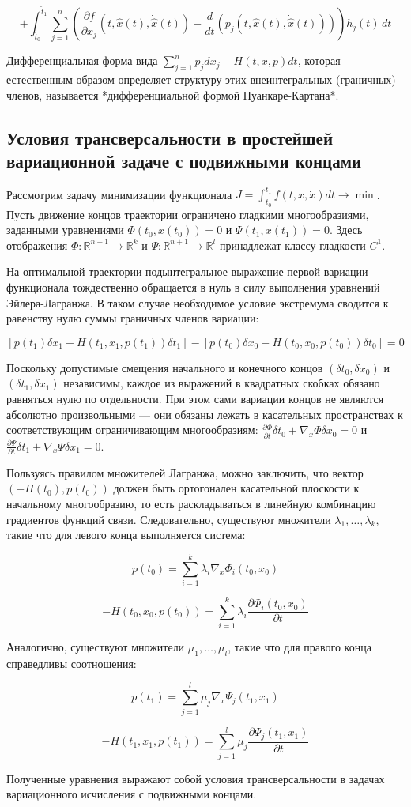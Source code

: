 $$+ \int_{\hat{t}_0}^{\hat{t}_1} \sum_{j=1}^n \left( \frac{\partial f}{\partial x_j}\left(t, \hat{x}(t), \dot{\hat{x}}(t)\right) - \frac{d}{dt} \left( p_j\left(t, \hat{x}(t), \dot{\hat{x}}(t)\right) \right) \right) h_j(t) \, dt$$

Дифференциальная форма вида $\sum_{j=1}^n p_j d x_j - H(t, x, p) dt$, которая естественным образом определяет структуру этих внеинтегральных (граничных) членов, называется *дифференциальной формой Пуанкаре-Картана*.

\subsection{Условия трансверсальности в простейшей вариационной задаче с подвижными концами}

Рассмотрим задачу минимизации функционала $J = \int_{t_0}^{t_1} f(t, x, \dot{x}) dt \to \min$.
Пусть движение концов траектории ограничено гладкими многообразиями, заданными уравнениями $\Phi(t_0, x(t_0)) = 0$ и $\Psi(t_1, x(t_1)) = 0$.
Здесь отображения $\Phi: \mathbb{R}^{n+1} \to \mathbb{R}^k$ и $\Psi: \mathbb{R}^{n+1} \to \mathbb{R}^l$ принадлежат классу гладкости $C^1$.

На оптимальной траектории подынтегральное выражение первой вариации функционала тождественно обращается в нуль в силу выполнения уравнений Эйлера-Лагранжа.
В таком случае необходимое условие экстремума сводится к равенству нулю суммы граничных членов вариации:

$$[p(t_1)\delta x_1 - H(t_1, x_1, p(t_1))\delta t_1] - [p(t_0)\delta x_0 - H(t_0, x_0, p(t_0))\delta t_0] = 0$$

Поскольку допустимые смещения начального и конечного концов $(\delta t_0, \delta x_0)$ и $(\delta t_1, \delta x_1)$ независимы, каждое из выражений в квадратных скобках обязано равняться нулю по отдельности.
При этом сами вариации концов не являются абсолютно произвольными — они обязаны лежать в касательных пространствах к соответствующим ограничивающим многообразиям: $\frac{\partial \Phi}{\partial t} \delta t_0 + \nabla_x \Phi \delta x_0 = 0$ и $\frac{\partial \Psi}{\partial t} \delta t_1 + \nabla_x \Psi \delta x_1 = 0$.

Пользуясь правилом множителей Лагранжа, можно заключить, что вектор $(-H(t_0), p(t_0))$ должен быть ортогонален касательной плоскости к начальному многообразию, то есть раскладываться в линейную комбинацию градиентов функций связи.
Следовательно, существуют множители $\lambda_1, \dots, \lambda_k$, такие что для левого конца выполняется система:

$$p(t_0) = \sum_{i=1}^k \lambda_i \nabla_x \Phi_i(t_0, x_0)$$

$$-H(t_0, x_0, p(t_0)) = \sum_{i=1}^k \lambda_i \frac{\partial \Phi_i(t_0, x_0)}{\partial t}$$

Аналогично, существуют множители $\mu_1, \dots, \mu_l$, такие что для правого конца справедливы соотношения:

$$p(t_1) = \sum_{j=1}^l \mu_j \nabla_x \Psi_j(t_1, x_1)$$

$$-H(t_1, x_1, p(t_1)) = \sum_{j=1}^l \mu_j \frac{\partial \Psi_j(t_1, x_1)}{\partial t}$$

Полученные уравнения выражают собой условия трансверсальности в задачах вариационного исчисления с подвижными концами.
